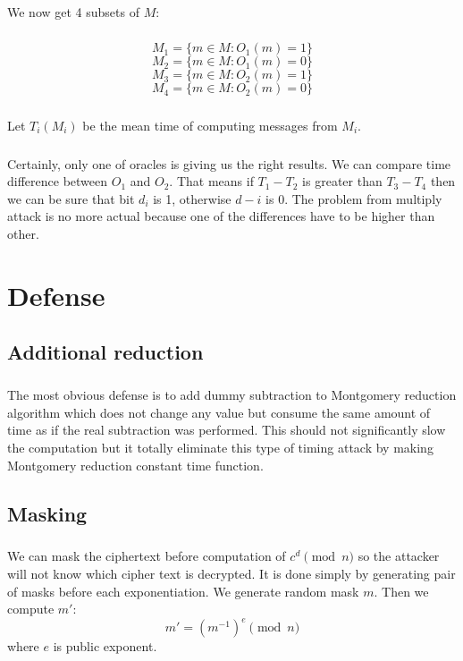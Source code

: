 \documentclass[thesis=B,english]{FITthesis}[2012/10/20]
\begin{document}
{\paragraph*{}{
We now get 4 subsets of \(M\):
}
\paragraph*{}
\[M_1 = \{m \in M : O_1(m) = 1\}\]
\[M_2 = \{m \in M : O_1(m) = 0\}\]
\[M_3 = \{m \in M : O_2(m) = 1\}\]
\[M_4 = \{m \in M : O_2(m) = 0\}\]

\paragraph*{}
{Let \(T_i(M_i)\) be the mean time of computing messages from \(M_i\). }


\paragraph*{}{
Certainly, only one of oracles is giving us the right results. We can compare time difference between \( O_1 \) and \(O_2\). That means if \(T_1 - T_2 \) is greater than 
\(T_3 - T_4\) then we can be sure that bit \(d_i\) is 1, otherwise \(d-i\) is 0. The problem from multiply attack is no more actual because one of the differences have to be higher
than other.
}


\chapter{Defense}
\section{Additional reduction}
\paragraph*{}{
The most obvious defense is to add dummy subtraction to Montgomery reduction algorithm which does not change any value but consume the same amount of time as if the real subtraction
was performed. This should not significantly slow the computation but it totally eliminate this type of timing attack by making Montgomery reduction constant time function.
}

\section{Masking}
\paragraph*{}{
We can mask the ciphertext before computation of \(c^d \pmod{n}\) so the attacker will not know which cipher text is decrypted. It is done simply by generating pair of masks 
before each exponentiation. We generate random mask \(m\). Then we compute \(m'\):
\[ m' = (m^{-1})^e \pmod{n}\]
where \(e\) is public exponent.
}
}
\end{document}
